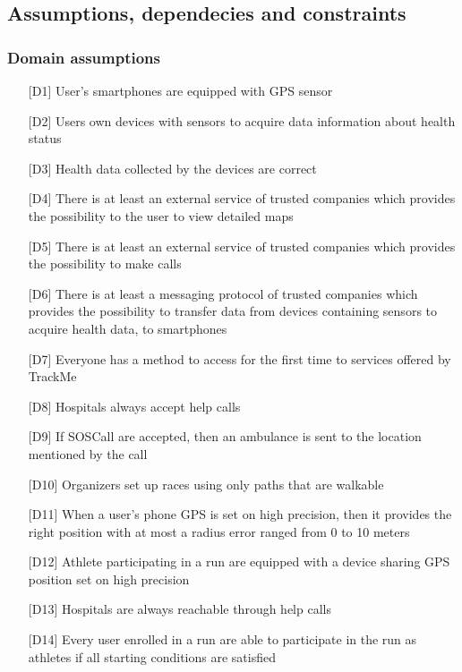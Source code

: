 \subsection{Assumptions, dependecies and constraints}

\subsubsection{Domain assumptions}
\begin{itemize}
\item[{[D1]}] User's smartphones are equipped with GPS sensor
\item[{[D2]}] Users own devices with sensors to acquire data information about health status
\item[{[D3]}] Health data collected by the devices are correct
\item[{[D4]}] There is at least an external service of trusted companies which provides the possibility to the user to view detailed maps
\item[{[D5]}] There is at least an external service of trusted companies which provides the possibility to make calls
\item[{[D6]}] There is at least a messaging protocol of trusted companies which provides the possibility to transfer data from devices containing sensors to acquire health data, to smartphones
\item[{[D7]}] Everyone has a method to access for the first time to services offered by TrackMe
\item[{[D8]}] Hospitals always accept help calls
\item[{[D9]}] If SOSCall are accepted, then an ambulance is sent to the location mentioned by the call
\item[{[D10]}] Organizers set up races using only paths that are walkable
\item[{[D11]}] When a user's phone GPS is set on high precision, then it provides the right position with at most a radius error ranged from 0 to 10 meters
\item[{[D12]}] Athlete participating in a run are equipped with a device sharing GPS position set on high precision
\item[{[D13]}] Hospitals are always reachable through help calls
\item[{[D14]}] Every user enrolled in a run are able to participate in the run as athletes if all starting conditions are satisfied
\end{itemize}
